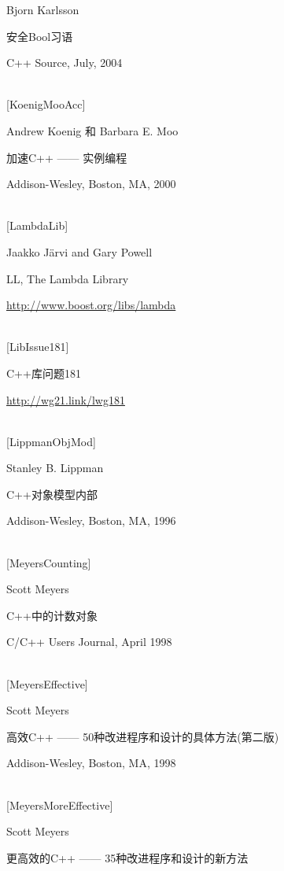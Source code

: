Bjorn Karlsson

安全Bool习语

C++ Source, July, 2004

\hspace*{\fill} \\ %
{[KoenigMooAcc]}

Andrew Koenig 和 Barbara E. Moo

加速C++ —— 实例编程

Addison-Wesley, Boston, MA, 2000

\hspace*{\fill} \\ %
{[LambdaLib]}

Jaakko J{\"a}rvi and Gary Powell

LL, The Lambda Library

\url{http://www.boost.org/libs/lambda}

\hspace*{\fill} \\ %
{[LibIssue181]}

C++库问题181

\url{http://wg21.link/lwg181}

\hspace*{\fill} \\ %
{[LippmanObjMod]}

Stanley B. Lippman

C++对象模型内部

Addison-Wesley, Boston, MA, 1996

\hspace*{\fill} \\ %
{[MeyersCounting]}

Scott Meyers

C++中的计数对象

C/C++ Users Journal, April 1998

\hspace*{\fill} \\ %
{[MeyersEffective]}

Scott Meyers

高效C++ —— 50种改进程序和设计的具体方法(第二版)

Addison-Wesley, Boston, MA, 1998

\hspace*{\fill} \\ %
{[MeyersMoreEffective]}

Scott Meyers

更高效的C++ —— 35种改进程序和设计的新方法

